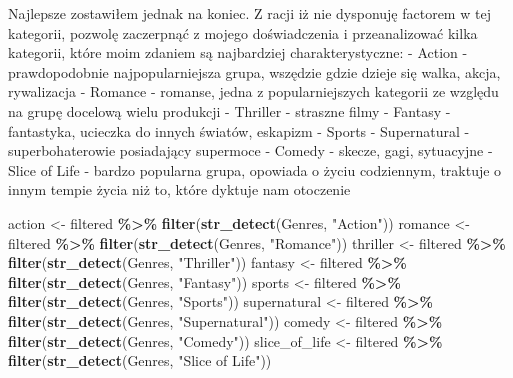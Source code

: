 \documentclass[
]{article}
\newenvironment{Shaded}{\begin{snugshade}}{\end{snugshade}}
\newcommand{\FunctionTok}[1]{\textcolor[rgb]{0.13,0.29,0.53}{\textbf{#1}}}
\newcommand{\NormalTok}[1]{#1}
\newcommand{\OtherTok}[1]{\textcolor[rgb]{0.56,0.35,0.01}{#1}}
\newcommand{\SpecialCharTok}[1]{\textcolor[rgb]{0.81,0.36,0.00}{\textbf{#1}}}
\newcommand{\StringTok}[1]{\textcolor[rgb]{0.31,0.60,0.02}{#1}}
\begin{document}
Najlepsze zostawiłem jednak na koniec. Z racji iż nie dysponuję factorem
w tej kategorii, pozwolę zaczerpnąć z mojego doświadczenia i
przeanalizować kilka kategorii, które moim zdaniem są najbardziej
charakterystyczne: - Action - prawdopodobnie najpopularniejsza grupa,
wszędzie gdzie dzieje się walka, akcja, rywalizacja - Romance - romanse,
jedna z popularniejszych kategorii ze względu na grupę docelową wielu
produkcji - Thriller - straszne filmy - Fantasy - fantastyka, ucieczka
do innych światów, eskapizm - Sports - Supernatural - superbohaterowie
posiadający supermoce - Comedy - skecze, gagi, sytuacyjne - Slice of
Life - bardzo popularna grupa, opowiada o życiu codziennym, traktuje o
innym tempie życia niż to, które dyktuje nam otoczenie

\begin{Shaded}
\begin{Highlighting}[]
\NormalTok{action }\OtherTok{\textless{}{-}}\NormalTok{ filtered }\SpecialCharTok{\%\textgreater{}\%}
   \FunctionTok{filter}\NormalTok{(}\FunctionTok{str\_detect}\NormalTok{(Genres, }\StringTok{"Action"}\NormalTok{))}
\NormalTok{romance }\OtherTok{\textless{}{-}}\NormalTok{ filtered }\SpecialCharTok{\%\textgreater{}\%}
   \FunctionTok{filter}\NormalTok{(}\FunctionTok{str\_detect}\NormalTok{(Genres, }\StringTok{"Romance"}\NormalTok{))}
\NormalTok{thriller }\OtherTok{\textless{}{-}}\NormalTok{ filtered }\SpecialCharTok{\%\textgreater{}\%}
   \FunctionTok{filter}\NormalTok{(}\FunctionTok{str\_detect}\NormalTok{(Genres, }\StringTok{"Thriller"}\NormalTok{))}
\NormalTok{fantasy }\OtherTok{\textless{}{-}}\NormalTok{ filtered }\SpecialCharTok{\%\textgreater{}\%}
   \FunctionTok{filter}\NormalTok{(}\FunctionTok{str\_detect}\NormalTok{(Genres, }\StringTok{"Fantasy"}\NormalTok{))}
\NormalTok{sports }\OtherTok{\textless{}{-}}\NormalTok{ filtered }\SpecialCharTok{\%\textgreater{}\%}
   \FunctionTok{filter}\NormalTok{(}\FunctionTok{str\_detect}\NormalTok{(Genres, }\StringTok{"Sports"}\NormalTok{))}
\NormalTok{supernatural }\OtherTok{\textless{}{-}}\NormalTok{ filtered }\SpecialCharTok{\%\textgreater{}\%}
   \FunctionTok{filter}\NormalTok{(}\FunctionTok{str\_detect}\NormalTok{(Genres, }\StringTok{"Supernatural"}\NormalTok{))}
\NormalTok{comedy }\OtherTok{\textless{}{-}}\NormalTok{ filtered }\SpecialCharTok{\%\textgreater{}\%}
   \FunctionTok{filter}\NormalTok{(}\FunctionTok{str\_detect}\NormalTok{(Genres, }\StringTok{"Comedy"}\NormalTok{))}
\NormalTok{slice\_of\_life }\OtherTok{\textless{}{-}}\NormalTok{ filtered }\SpecialCharTok{\%\textgreater{}\%}
   \FunctionTok{filter}\NormalTok{(}\FunctionTok{str\_detect}\NormalTok{(Genres, }\StringTok{"Slice of Life"}\NormalTok{))}


\end{Highlighting}
\end{Shaded}
\end{document}
